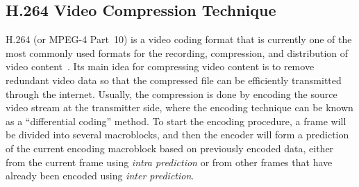 \subsection{H.264 Video Compression Technique}
\label{sec::H264CompressionIntro}
%
H.264 (or MPEG-4 Part~10) is a video coding format that is currently one of the most commonly used formats for the recording, compression, and distribution of video content~\cite{H264Book}.
Its main idea for compressing video content is to remove redundant video data so that the compressed file can be efficiently transmitted through the internet.
Usually, the compression is done by encoding the source video stream at the transmitter side, where the encoding technique can be known as a ``differential coding'' method.
To start the encoding procedure, a frame will be divided into several macroblocks, and then the encoder will form a prediction of the current encoding macroblock based on previously encoded data, either from the current frame using \emph{intra prediction} or from other frames that have already been encoded using \emph{inter prediction}.

